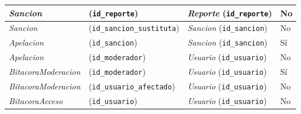 \begin{center}
\begin{longtable}{|L{0.21\textwidth}|L{0.26\textwidth}|L{0.29\textwidth}|L{0.12\textwidth}|}
\textit{Sancion} & (\texttt{id\_\allowbreak{}reporte}) & \textit{Reporte} (\texttt{id\_\allowbreak{}reporte}) & No \\ \hline
\textit{Sancion} & (\texttt{id\_\allowbreak{}sancion\_\allowbreak{}sustituta}) & \textit{Sancion} (\texttt{id\_\allowbreak{}sancion}) & No \\ \hline
\textit{Apelacion} & (\texttt{id\_\allowbreak{}sancion}) & \textit{Sancion} (\texttt{id\_\allowbreak{}sancion}) & Sí \\ \hline
\textit{Apelacion} & (\texttt{id\_\allowbreak{}moderador}) & \textit{Usuario} (\texttt{id\_\allowbreak{}usuario}) & No \\ \hline
\textit{Bitacora\-Moderacion} & (\texttt{id\_\allowbreak{}moderador}) & \textit{Usuario} (\texttt{id\_\allowbreak{}usuario}) & Sí \\ \hline
\textit{Bitacora\-Moderacion} & (\texttt{id\_\allowbreak{}usuario\_\allowbreak{}afectado}) & \textit{Usuario} (\texttt{id\_\allowbreak{}usuario}) & No \\ \hline
\textit{Bitacora\-Acceso} & (\texttt{id\_\allowbreak{}usuario}) & \textit{Usuario} (\texttt{id\_\allowbreak{}usuario}) & No \\ \hline
\end{longtable}
\end{center}
